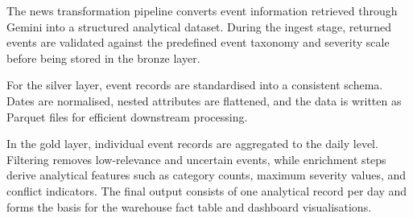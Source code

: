 \documentclass[11pt,a4paper]{article}
\begin{document}
The news transformation pipeline converts event information retrieved
through Gemini into a structured analytical dataset. During the ingest
stage, returned events are validated against the predefined event
taxonomy and severity scale before being stored in the bronze layer.

For the silver layer, event records are standardised into a consistent
schema. Dates are normalised, nested attributes are flattened, and the
data is written as Parquet files for efficient downstream processing.

In the gold layer, individual event records are aggregated to the
daily level. Filtering removes low-relevance and uncertain events,
while enrichment steps derive analytical features such as category
counts, maximum severity values, and conflict indicators. The final
output consists of one analytical record per day and forms the basis
for the warehouse fact table and dashboard visualisations.
\end{document}
